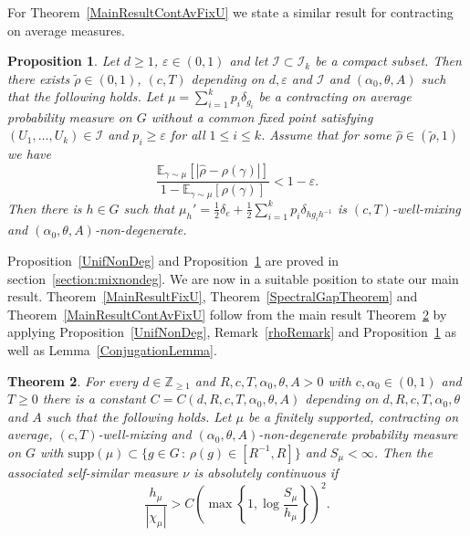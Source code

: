\documentclass[10pt, english,oneside,reqno]{amsart}
\theoremstyle{plain}
\newtheorem{theorem}{Theorem}[section]
\newtheorem{proposition}[theorem]{Proposition}
\theoremstyle{remark}
\numberwithin{equation}{section}
\numberwithin{figure}{section}
\newcommand{\eps}{\varepsilon}
\newcommand{\Z}{\mathbb{Z}}
\newcommand{\E}{\mathbb{E}}
\begin{document}
    For Theorem~\ref{MainResultContAvFixU} we state a similar result for contracting on average measures.

    \begin{proposition}\label{UnifNonDegContAv}
     Let $d\geq 1$, $\eps \in (0,1)$ and let $\mathcal{I} \subset \mathcal{I}_k$ be a compact subset. Then there exists $\tilde{\rho} \in (0,1)$, $(c,T)$ depending on $d, \eps$ and $\mathcal{I}$ and $(\alpha_0,\theta, A)$ such that the following holds. Let $\mu = \sum_{i = 1}^k p_i \delta_{g_i}$ be a contracting on average probability measure on $G$ without a common fixed point satisfying $(U_1, \ldots , U_k) \in \mathcal{I}$ and $p_i \geq \eps$ for all $1\leq i \leq k$. Assume that for some $\hat{\rho} \in (\tilde{\rho},1)$ we have $$\frac{\E_{\gamma\sim \mu}[|\hat{\rho} - \rho(\gamma)|]}{1 - \E_{\gamma\sim\mu}[\rho(\gamma)]} < 1 - \varepsilon.$$ Then there is $h\in G$ such that $\mu_h' =  \frac{1}{2}\delta_e + \frac{1}{2}\sum_{i = 1}^k p_i\delta_{hg_ih^{-1}}$ is $(c,T)$-well-mixing and $(\alpha_0,\theta, A)$-non-degenerate.
    \end{proposition}

    
    
    Proposition~\ref{UnifNonDeg} and Proposition~\ref{UnifNonDegContAv} are proved in section~\ref{section:mixnondeg}. We are now in a suitable position to state our main result. Theorem~\ref{MainResultFixU}, Theorem~\ref{SpectralGapTheorem} and Theorem~\ref{MainResultContAvFixU} follow from the main result Theorem~\ref{MainResult} by applying Proposition~\ref{UnifNonDeg}, Remark~\ref{rhoRemark} and Proposition~\ref{UnifNonDegContAv} as well as Lemma~\ref{ConjugationLemma}.

	\begin{theorem}\label{MainResult} For every $d \in \Z_{\geq 1}$ and $R, c, T, \alpha_0, \theta, A > 0$ with $c, \alpha_0 \in (0,1)$ and $T \geq 0$ there is a constant $C = C(d,R, c, T, \alpha_0, \theta,A)$ depending on $d, R, c, T, \alpha_0, \theta$ and $A$ such that the following holds. Let $\mu$ be a finitely supported, contracting on average, $(c,T)$-well-mixing and $(\alpha_0 , \theta,A)$-non-degenerate probability measure on $G$ with $\mathrm{supp}(\mu) \subset \{ g \in G \,:\, \rho(g) \in [R^{-1},R] \}$ and $S_{\mu} < \infty$. Then the associated self-similar measure $\nu$ is absolutely continuous if $$\frac{h_{\mu}}{|\chi_{\mu}|} > C \left( \max\left\{ 1, \log \frac{S_{\mu}}{h_{\mu}} \right\} \right)^2.$$  
    \end{theorem}
\end{document}
